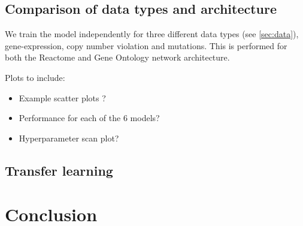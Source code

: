 \documentclass[NOTE, disdraft=true, UKenglish]{\DISCDTLATEXPATH UCLCDTDISdoc}
\begin{document}
\subsection{Comparison of data types and architecture}
We train the model independently for three different data types (see \ref{sec:data}), gene-expression, copy number violation and mutations. This is performed for both the Reactome and Gene Ontology network architecture.
\\
{   \color{red}
Plots to include:
\begin{itemize}
    \item Example scatter plots ?
\item Performance for each of the 6 models?
\item Hyperparameter scan plot?
\end{itemize}}
\subsection{Transfer learning}
%

\section{Conclusion}
\label{sec:conclusion}

\printbibliography
%
\end{document}
